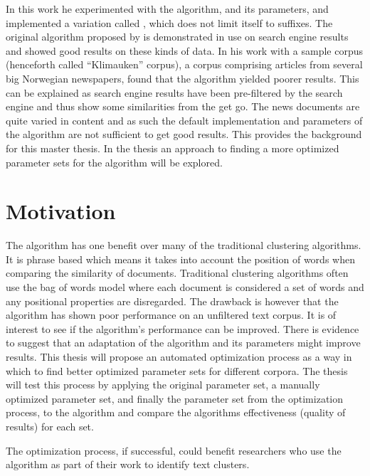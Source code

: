 In this work he experimented with the \STC algorithm, and its parameters, and implemented a variation called \CTC, which does not limit itself to suffixes. The original \STC algorithm proposed by \textcite{Oren1998} is demonstrated in use on search engine results and showed good results on these kinds of data. In his work with a sample corpus (henceforth called ``Klimauken'' corpus), a corpus comprising articles from several big Norwegian newspapers, \cite{Moe2013} found that the \STC algorithm yielded poorer results. This can be explained as search engine results have been pre-filtered by the search engine and thus show some similarities from the get go. The news documents are quite varied in content and as such the default implementation and parameters of the \STC algorithm are not sufficient to get good results. This provides the background for this master thesis. In the thesis an approach to finding a more optimized parameter sets for the \CTC algorithm will be explored.


\section{Motivation}

The \STC algorithm has one benefit over many of the traditional clustering algorithms. It is phrase based which means it takes into account the position of words when comparing the similarity of documents. Traditional clustering algorithms often use the bag of words model where each document is considered a set of words and any positional properties are disregarded. The drawback is however that the \STC algorithm has shown poor performance on an unfiltered text corpus. It is of interest to see if the algorithm's performance can be improved. There is evidence to suggest that an adaptation of the algorithm and its parameters might improve results. This thesis will propose an automated optimization process as a way in which to find better optimized parameter sets for different corpora. The thesis will test this process by applying the original parameter set, a manually optimized parameter set, and finally the parameter set from the optimization process, to the algorithm and compare the algorithms effectiveness (quality of results) for each set.

The optimization process, if successful, could benefit researchers who use the algorithm as part of their work to identify text clusters.

